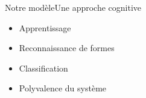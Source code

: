 \begin{frame}{Notre modèle}{Une approche cognitive}
	\begin{itemize}
		\item Apprentissage
		\item Reconnaissance de formes
		\item Classification
		\item Polyvalence du système
	\end{itemize}
\end{frame}